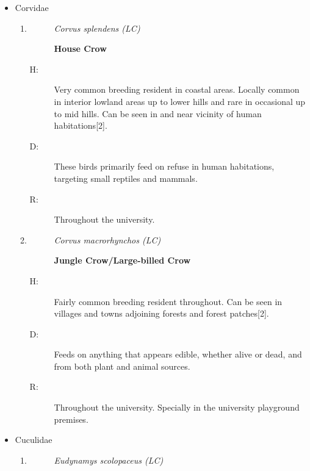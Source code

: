 \begin{itemize}
\begin{enumerate}
%
\end{enumerate}%
\item%
Corvidae%
\begin{enumerate}%
\item%
\begin{description}%
\item[]%
\textit{Corvus splendens (LC)}%
\item[]%
\textbf{House Crow}%
\end{description}%
\begin{description}%
\item[H: ]%
Very common breeding resident in coastal areas. Locally common in interior lowland areas up to lower hills and rare in occasional up to mid hills. Can be seen in and near vicinity of human habitations{[}2{]}.%
\item[D: ]%
These birds primarily feed on refuse in human habitations, targeting small reptiles and mammals. %
\item[R: ]%
Throughout the university. %
\end{description}%
\item%
\begin{description}%
\item[]%
\textit{Corvus macrorhynchos (LC)}%
\item[]%
\textbf{Jungle Crow/Large{-}billed Crow}%
\end{description}%
\begin{description}%
\item[H: ]%
Fairly common breeding resident throughout. Can be seen in villages and towns adjoining forests and forest patches{[}2{]}.%
\item[D: ]%
Feeds on anything that appears edible, whether alive or dead, and from both plant and animal sources.%
\item[R: ]%
Throughout the university. Specially in the university playground premises. %
\end{description}%
\end{enumerate}%
\item%
Cuculidae%
\begin{enumerate}%
\item%
\begin{description}%
\item[]%
\textit{Eudynamys scolopaceus (LC)}%

\end{description}
\end{enumerate}
\end{itemize}
